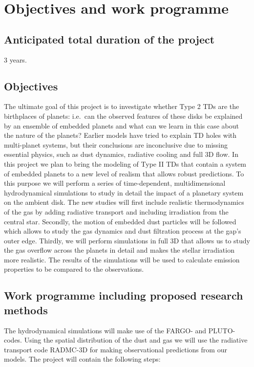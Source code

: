 \documentclass[10pt,fleqn,twoside]{article}
\begin{document}
\section{Objectives and work programme}
\renewcommand{\leftmark}{\sc Objectives and work programme}


\subsection{Anticipated total duration of the project}

3 years.

\subsection{Objectives}

The ultimate goal of this project is to investigate whether Type 2 TDs 
are the birthplaces of planets: i.e.\ can the observed features of these disks
be explained by an ensemble of embedded planets and what can we learn in this case about the nature
of the planets?
Earlier models have tried to explain TD holes with multi-planet systems, but their
conclusions are inconclusive due to missing essential physics, such as dust dynamics, radiative cooling and
full 3D flow.
In this project we plan to bring the modeling of Type II TDs that contain a system of embedded planets to a new level of realism
that allows robust predictions.
To this purpose we will perform a series of time-dependent, multidimensional hydrodynamical simulations to study in detail the impact of
a planetary system on the ambient disk. The new studies will first include realistic thermodynamics of the gas by adding radiative transport
and including irradiation from the central star. Secondly, the motion of embedded dust particles will be followed
which allows to study the gas dynamics and dust filtration process at the gap's outer edge.
Thirdly, we will perform simulations in full 3D that allows us to study the gas overflow
across the planets in detail and makes the stellar irradiation more realistic.
The results of the simulations will be used to calculate emission properties to be compared to the observations.


\subsection{Work programme including proposed research methods}

%
The hydrodynamical simulations will make use of the FARGO- and {PLUTO}-codes.
Using the spatial distribution of the dust and gas we will use the radiative transport
code RADMC-3D for making observational predictions from our models.
The project will contain the following steps:
\end{document}
